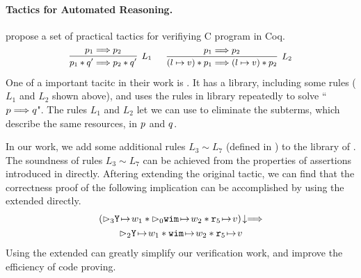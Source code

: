 \paragraph{\textbf{Tactics for Automated Reasoning.}} 
\cite{practical-tactics} propose a set of practical tactics 
for verifiying C program in Coq. 
\[
    \small
    \infer[L_1]
    {
        \astP_1 \sepstar \astQ' \Longrightarrow \astP_2 \sepstar \astQ'
    }
    {
        \astP_1 \Longrightarrow \astP_2
    } \quad \ \  
    \infer[L_2]
    {
        (\sepsto{\loc}{\val}) \sepstar \astP_1 \Longrightarrow 
        (\sepsto{\loc}{\val}) \sepstar \astP_2
    }
    {
        \astP_1 \Longrightarrow \astP_2
    }
\]
One of a important tacitc in their work is \sepcancel{}. 
It has a library, including some rules (\eg{} $L_1$ and $L_2$ shown above), 
and uses the rules in library repeatedly to solve 
``$p \Longrightarrow q$". The rules $L_1$ and $L_2$  
let we can use \sepcancel{} to eliminate the 
subterms, which describe the same resources, 
in $p$ and $q$.

In our work, we add some additional rules $L_3 \sim L_7$ 
(defined in \Fig{\ref{fig:ext-rule-tac-sepcancel}})
to the library of \sepcancel{}. The soundness of rules $L_3 \sim L_7$ 
can be achieved from the properties of assertions introduced in 
\Sec{\ref{subsec:assertions}} directly. Aftering extending the original 
\sepcancel{} tactic, we can find that the correctness proof
of the following implication can be accomplished by using 
the extended \sepcancel{} directly.
\begin{multline*}
    \nxtAst{(\dlyregst{3}{\regY}{\word_1} \sepstar 
    \dlyregst{0}{\regwim}{\word_2} \sepstar 
    \regst{\reg{5}}{\val})} \Longrightarrow \\
    \dlyregst{2}{\regY}{\word_1} \sepstar 
    \regst{\regwim}{\word_2} \sepstar 
    \regst{\reg{5}}{\val}
\end{multline*}
Using the extended \sepcancel{} can greatly simplify our verification 
work, and improve the efficiency of code proving. 

